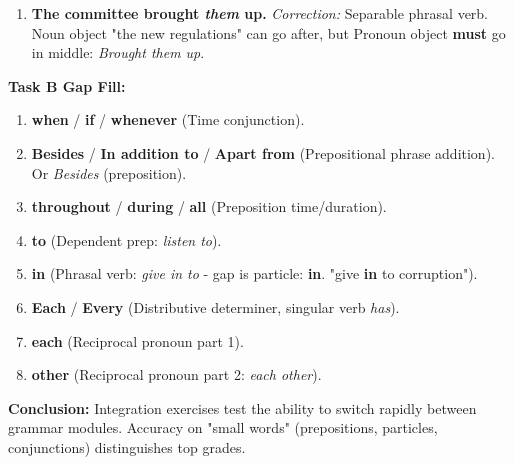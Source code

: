 \documentclass[11pt]{article}
\begin{document}
\begin{exoresolu}
\begin{enumerate}
        \item \textbf{The committee brought \emph{them} up.} \textit{Correction:} Separable phrasal verb. Noun object "the new regulations" can go after, but Pronoun object \textbf{must} go in middle: \emph{Brought them up}.
    \end{enumerate}
    \textbf{Task B Gap Fill:}
    \begin{enumerate}
        \item \textbf{when} / \textbf{if} / \textbf{whenever} (Time conjunction).
        \item \textbf{Besides} / \textbf{In addition to} / \textbf{Apart from} (Prepositional phrase addition). Or \emph{Besides} (preposition).
        \item \textbf{throughout} / \textbf{during} / \textbf{all} (Preposition time/duration).
        \item \textbf{to} (Dependent prep: \emph{listen to}).
        \item \textbf{in} (Phrasal verb: \emph{give in to} - gap is particle: \textbf{in}. "give \textbf{in} to corruption").
        \item \textbf{Each} / \textbf{Every} (Distributive determiner, singular verb \emph{has}).
        \item \textbf{each} (Reciprocal pronoun part 1).
        \item \textbf{other} (Reciprocal pronoun part 2: \emph{each other}).
    \end{enumerate}
    \textbf{Conclusion:} Integration exercises test the ability to switch rapidly between grammar modules. Accuracy on "small words" (prepositions, particles, conjunctions) distinguishes top grades.
\end{exoresolu}
\end{document}
